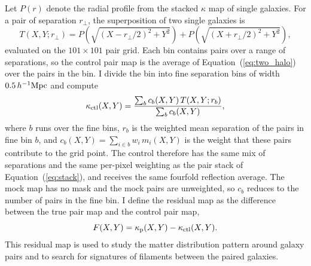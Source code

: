 \documentclass[11pt,letterpaper]{article}
\newcommand{\hinvMpc}{h^{-1}{\rm Mpc}}
\begin{document}
Let $P(r)$ denote the radial profile from the stacked $\kappa$ map of single galaxies.
For a pair of separation $r_{\perp}$, the superposition of two single galaxies is
\begin{equation}
  T(X,Y;r_{\perp}) = P\!\left(\sqrt{(X-r_{\perp}/2)^{2}+Y^{2}}\right)
         + P\!\left(\sqrt{(X+r_{\perp}/2)^{2}+Y^{2}}\right),
  \label{eq:two_halo}
\end{equation}
evaluated on the $101\times101$ pair grid. Each bin contains pairs over a
range of separations, so the control pair map is the average of
Equation~(\ref{eq:two_halo}) over the pairs in the bin. I divide the bin
into fine separation bins of width $0.5\,\hinvMpc$ and compute
\begin{equation}
  \kappa_{\rm ctl}(X,Y) = \frac{\sum_{b} c_{b}(X,Y)\,T(X,Y;r_{b})}
                               {\sum_{b} c_{b}(X,Y)},
  \label{eq:control}
\end{equation}
where $b$ runs over the fine bins, $r_{b}$ is the weighted mean separation
of the pairs in fine bin $b$, and
$c_{b}(X,Y)=\sum_{i\in b} w_{i}\,m_{i}(X,Y)$ is the weight that these pairs
contribute to the grid point. The control therefore has the same mix of
separations and the same per-pixel weighting as the pair stack of
Equation~(\ref{eq:stack}), and receives the same fourfold reflection
average. The mock map has no mask and the mock pairs are
unweighted, so $c_{b}$ reduces to the number of pairs in the fine bin.
I define the residual map as the difference between the true pair map and the control pair map,
\begin{equation}
  F(X,Y) = \kappa_{\rm p}(X,Y)-\kappa_{\rm ctl}(X,Y).
  \label{eq:filament}
\end{equation}
This residual map is used to study the matter distribution pattern around galaxy pairs and to search for signatures of filaments between the
paired galaxies. 

\end{document}
